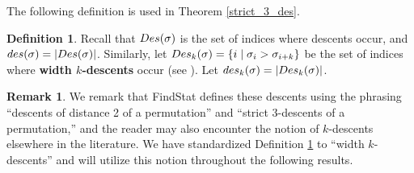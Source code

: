\documentclass{amsart}
\theoremstyle{definition}
\newtheorem{definition}[thm]{Definition}
\newtheorem{remark}[thm]{Remark}
\newcommand{\inv}{\textnormal{inv}}
\newcommand{\Des}{\textnormal{Des}}
\newcommand{\des}{\textnormal{des}}
\begin{document}

  
  The following definition is used in Theorem \ref{strict_3_des}.
  \begin{definition}\label{def:width_k}
  Recall that $\Des(\sigma)$ is the set of indices where descents occur, and $\des(\sigma) = |\Des(\sigma)|$. Similarly, let $\Des_k(\sigma) = \{ i\mid\sigma_i>\sigma_{i+k}\}$ be the set of indices where \textbf{width $k$-descents} occur (see \cite{widthk}). Let $\des_k(\sigma) = |\Des_k(\sigma)|$. 
\end{definition}
  
\begin{remark}
We remark that FindStat defines these descents using the phrasing ``descents of distance 2 of a permutation'' and ``strict 3-descents of a permutation,'' and the reader may also encounter the notion of $k$-descents elsewhere in the literature. We have standardized Definition \ref{def:width_k} to ``width $k$-descents'' and will utilize this notion throughout the following results.
\end{remark}
\end{document}
